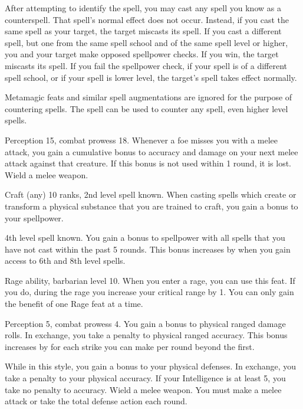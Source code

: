 After attempting to identify the spell, you may cast any spell you know as a counterspell.
That spell's normal effect does not occur.
Instead, if you cast the same spell as your target, the target miscasts its spell.
If you cast a different spell, but one from the same spell school and of the same spell level or higher, you and your target make opposed spellpower checks.
If you win, the target miscasts its spell.
If you fail the spellpower check, if your spell is of a different spell school, or if your spell is lower level, the target's spell takes effect normally.

Metamagic feats and similar spell augmentations are ignored for the purpose of countering spells.
The  spell can be used to counter any spell, even higher level spells.

\featpres Perception 15, combat prowess 18.
\featben Whenever a foe misses you with a melee attack, you gain a cumulative  bonus to accuracy and damage on your next melee attack against that creature.
If this bonus is not used within 1 round, it is lost.
\stylereq Wield a melee weapon.

\featpres Craft (any) 10 ranks, 2nd level spell known.
\featben When casting spells which create or transform a physical substance that you are trained to craft, you gain a  bonus to your spellpower.

\featpre 4th level spell known.
\featben You gain a  bonus to spellpower with all spells that you have not cast within the past 5 rounds.
This bonus increases by  when you gain access to 6th and 8th level spells.

\featpres Rage ability, barbarian level 10.
\featben When you enter a rage, you can use this feat. If you do, during the rage you increase your critical range by 1.
 You can only gain the benefit of one Rage feat at a time.

\featpres Perception 5, combat prowess 4.
\featben You gain a  bonus to physical ranged damage rolls.
In exchange, you take a  penalty to physical ranged accuracy.
This bonus increases by  for each strike you can make per round beyond the first.

\featben While in this style, you gain a  bonus to your physical defenses.
In exchange, you take a  penalty to your physical accuracy.
If your Intelligence is at least 5, you take no penalty to accuracy.
\stylereq Wield a melee weapon. You must make a melee attack or take the total defense action each round.

